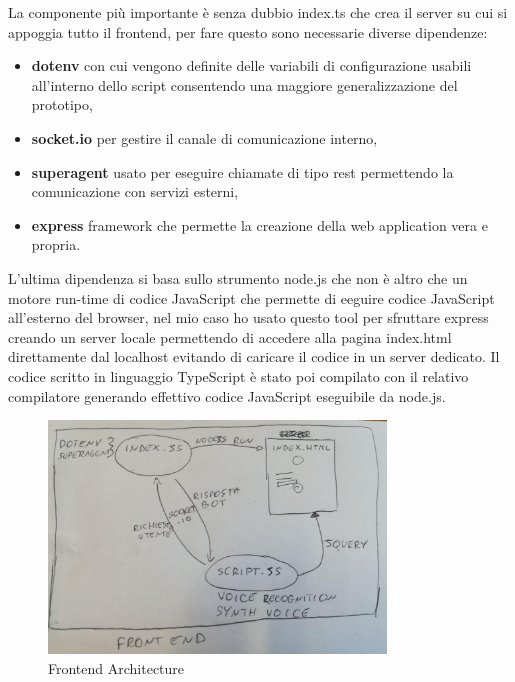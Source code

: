 La componente più importante è senza dubbio index.ts che crea il server su cui si appoggia tutto il frontend, per fare questo sono necessarie diverse dipendenze:
\begin{itemize}
\item \textbf{dotenv} con cui vengono definite delle variabili di configurazione usabili all'interno dello script consentendo una maggiore generalizzazione del prototipo,
\item \textbf{socket.io} per gestire il canale di comunicazione interno,
\item \textbf{superagent} usato per eseguire chiamate di tipo rest permettendo la comunicazione con servizi esterni,
\item  \textbf{express} framework che permette la creazione della web application vera e propria.
\end{itemize}
L'ultima dipendenza si basa sullo strumento node.js che non è altro che un motore run-time di codice JavaScript che permette di eeguire codice JavaScript all'esterno del browser, nel mio caso ho usato questo tool per sfruttare express creando un server locale permettendo di accedere alla pagina index.html direttamente dal localhost evitando di caricare il codice in un server dedicato.
Il codice scritto in linguaggio TypeScript è stato poi compilato con il relativo compilatore generando effettivo codice JavaScript eseguibile da node.js.
\begin{figure}[H]
 \centering
  \includegraphics[width=0.8\textwidth]{img/frontend.jpg}
 \caption{Frontend Architecture}
\end{figure}


